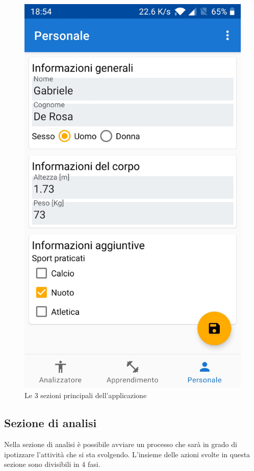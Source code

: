 \begin{figure}[H]
    \includegraphics[scale = 0.10]{assets/images/screenshots/3a_Init.jpg}
    \caption{Le 3 sezioni principali dell'applicazione}
    \label{fig:screenshots}
\end{figure}

\subsection{Sezione di analisi}
Nella sezione di analisi è possibile avviare un processo che sarà in grado di ipotizzare l'attività che si sta svolgendo.
L'insieme delle azioni svolte in questa sezione sono divisibili in 4 fasi.

